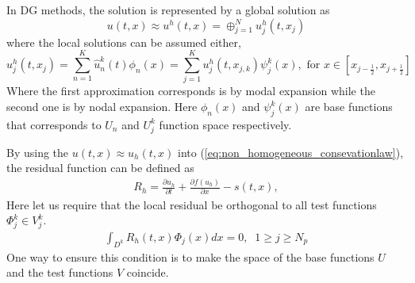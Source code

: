 \begin{frame}	
	In DG methods, the solution is represented by a global solution as
	\begin{equation}
   u(t,x) \approx u^h(t,x) = \oplus^N_{j=1} u_j^h(t,x_j)
  \end{equation}
	where the local solutions can be assumed either,
	\begin{equation}
		u_j^h(t,x_j) = \sum_{n=1}^{K} \hat{u}_n^k(t) \phi_{n}(x)
								 = \sum_{j=1}^{K} u_j^h(t,x_{j,k}) \psi_{j}^k(x), 
								\text{ for } x \in [x_{j-\frac{1}{2}},x_{j+\frac{1}{2}}]
	\end{equation}
	Where the first approximation corresponds is by modal expansion while the second one is by nodal expansion.
	Here $\phi_{n}(x)$ and $\psi_{j}^k(x)$ are base functions that corresponds to $U_n$ and $U_j^k$ function space respectively.
	
\end{frame}

\begin{frame}
	By using the $u(t,x) \approx u_h(t,x)$ into (\ref{eq:non_homogeneous_consevationlaw}), the residual function can be defined as
	\begin{align}
	 R_h = \frac{\partial u_h}{\partial t} + \frac{\partial f(u_h)}{\partial x} - s(t,x),
	\label{eq:residual}
	\end{align}
	Here let us require that the local residual be orthogonal to all test functions $\Phi_j^k \in V_j^k$.
	\begin{align}
	\int_{D^k} R_h(t,x) \Phi_j(x)dx = 0, \;\; 1 \geq j \geq N_p
	\end{align}
	One way to ensure this condition is to make the space of the base functions $U$ and the test functions $V$ coincide.
\end{frame}


